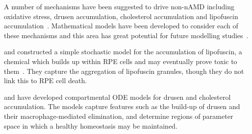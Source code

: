 \documentclass{article}
\begin{document}
A number of mechanisms have been suggested to drive non-nAMD including oxidative stress, drusen accumulation, cholesterol accumulation and lipofuscin accumulation~\cite{Ambati_and_Fowler_2012,Handa_et_al_2019}. Mathematical models have been developed to consider each of these mechanisms and this area has great potential for future modelling studies~\cite{Handa_et_al_2019,Luthert_et_al_2018}.

\citet{Mazzitello_et_al_2009} and \citet{Family_et_al_2010} constructed a simple stochastic model for the accumulation of lipofuscin, a chemical which builds up within RPE cells and may eventually prove toxic to them~\cite{Sparrow_and_Boulton_2005}. They capture the aggregation of  lipofuscin granules, though they do not link this to RPE cell death.

\citet{Zekavat_et_al_2017} and \citet{Scheepers_et_al_2020} have developed compartmental ODE models for drusen and cholesterol accumulation. The models capture features such as the build-up of drusen and their macrophage-mediated elimination, and determine regions of parameter space in which a healthy homeostasis may be maintained.
\end{document}
